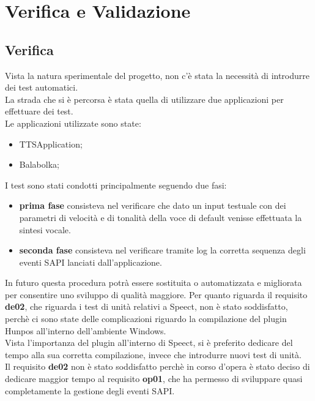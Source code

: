 \chapter{Verifica e Validazione}
\thispagestyle{empty}

\newpage
\section{Verifica}
Vista la natura sperimentale del progetto, non c'è stata la necessità di introdurre dei test automatici.\\
La strada che si è percorsa è stata quella di utilizzare due applicazioni per effettuare dei test.\\
Le applicazioni utilizzate sono state:
\begin{itemize}
	\item TTSApplication;
	\item Balabolka;
\end{itemize}
I test sono stati condotti principalmente seguendo due fasi:
\begin{itemize}
	\item \textbf{prima fase} consisteva nel verificare che dato un input testuale con dei parametri di velocità e di tonalità della voce di default venisse effettuata la sintesi vocale.
	\item \textbf{seconda fase} consisteva nel verificare tramite log la corretta sequenza degli eventi SAPI lanciati dall'applicazione.
\end{itemize}
In futuro questa procedura potrà essere sostituita o automatizzata e migliorata per consentire uno sviluppo di qualità maggiore.
Per quanto riguarda il requisito \textbf{de02}, che riguarda i test di unità relativi a Speect, non è stato soddisfatto, perchè ci sono state delle complicazioni riguardo la compilazione del plugin Hunpos all'interno dell'ambiente Windows.\\
Vista l'importanza del plugin all'interno di Speect, si è preferito dedicare del tempo alla sua corretta compilazione, invece che introdurre nuovi test di unità.\\
Il requisito \textbf{de02} non è stato soddisfatto perchè in corso d'opera è stato deciso di dedicare maggior tempo al requisito \textbf{op01}, che ha permesso di sviluppare quasi completamente la gestione degli eventi SAPI.
